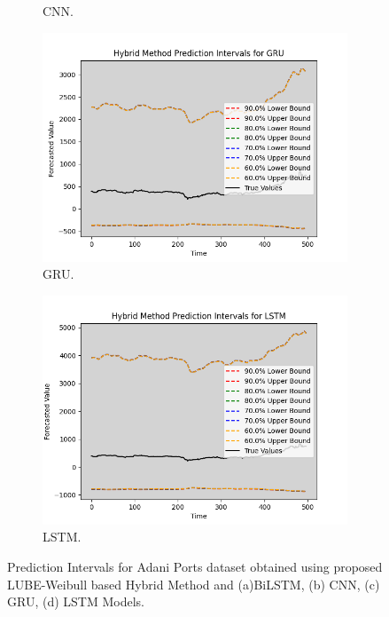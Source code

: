 \begin{figure}[H]
\begin{minipage}{0.45\textwidth}
\begin{subfigure}[b]{\textwidth}
            \caption{CNN.}
        \end{subfigure}
        \begin{subfigure}[b]{\textwidth}
            \centering
            \includegraphics[width=\textwidth]{Chap03/figs/GRU_hybrid_method_plot_AdaniPorts_Method2.png}
            \caption{GRU.}
        \end{subfigure}
        \begin{subfigure}[b]{\textwidth}
            \centering
            \includegraphics[width=\textwidth]{Chap03/figs/LSTM_hybrid_method_plot_AdaniPorts_Method2.png}
            \caption{LSTM.}
        \end{subfigure}
        \caption{Prediction Intervals for Adani Ports dataset obtained using proposed LUBE-Weibull based Hybrid Method and (a)BiLSTM, (b) CNN, (c) GRU, (d) LSTM Models.}

\end{minipage}
\end{figure}
